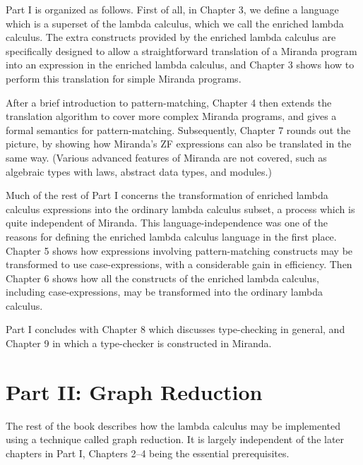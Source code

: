 Part I is organized as follows. First of all, in Chapter 3, we define a language
which is a superset of the lambda calculus, which we call the enriched lambda
calculus. The extra constructs provided by the enriched lambda calculus are
specifically designed to allow a straightforward translation of a Miranda
program into an expression in the enriched lambda calculus, and Chapter 3
shows how to perform this translation for simple Miranda programs.

After a brief introduction to pattern-matching, Chapter 4 then extends the
translation algorithm to cover more complex Miranda programs, and gives a
formal semantics for pattern-matching. Subsequently, Chapter 7 rounds out
the picture, by showing how Miranda's ZF expressions can also be translated
in the same way. (Various advanced features of Miranda are not covered,
such as algebraic types with laws, abstract data types, and modules.)

Much of the rest of Part I concerns the transformation of enriched lambda
calculus expressions into the ordinary lambda calculus subset, a process which
is quite independent of Miranda. This language-independence was one of the
reasons for defining the enriched lambda calculus language in the first place.
Chapter 5 shows how expressions involving pattern-matching constructs may
be transformed to use case-expressions, with a considerable gain in efficiency.
Then Chapter 6 shows how all the constructs of the enriched lambda calculus,
including case-expressions, may be transformed into the ordinary lambda
calculus.

Part I concludes with Chapter 8 which discusses type-checking in general,
and Chapter 9 in which a type-checker is constructed in Miranda.

\section{Part II: Graph Reduction}

The rest of the book describes how the lambda calculus may be implemented
using a technique called graph reduction. It is largely independent of the later
chapters in Part I, Chapters 2--4 being the essential prerequisites.

